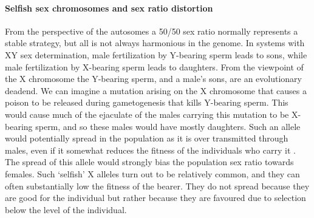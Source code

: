 {\paragraph{Selfish sex chromosomes and sex ratio distortion}
From the perspective of the autosomes a 50/50 sex ratio normally represents
a stable strategy, but all is not always harmonious in the genome. In
systems with XY sex determination, male fertilization by Y-bearing sperm
leads to sons, while male fertilization by X-bearing sperm leads to daughters. 
From the viewpoint of the X chromosome the Y-bearing sperm, and a
male's sons, are an evolutionary deadend. We can imagine a mutation
arising on the X chromosome that causes a poison to be released
during gametogenesis that kills Y-bearing sperm. This would cause much
of the ejaculate of the males carrying this mutation to be X-bearing sperm, and so these males would have mostly
daughters. Such an allele would potentially spread in the population
as it is over transmitted through males, even if it somewhat reduces
the fitness of the individuals who carry it \citep{hamilton1967extraordinary}. The spread of this allele would strongly
bias the population sex ratio towards females. Such `selfish' X
alleles turn out to be relatively common, and they can often
substantially low the fitness of the bearer. They do not spread because they are good for the individual but rather because
they are favoured due to selection below the level of the individual.

}
